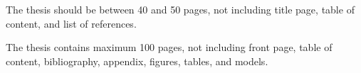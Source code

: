 \documentclass[a4paper]{article}
\begin{document}
\noindent The thesis should be between 40 and 50 pages, not including title page, table of content, and  list of references.\cite{mru2018requirements}

\noindent The thesis contains maximum 100 pages, not including front page, table of content, bibliography, appendix, figures, tables, and models.\cite{au2020guidelines}



\end{document}
